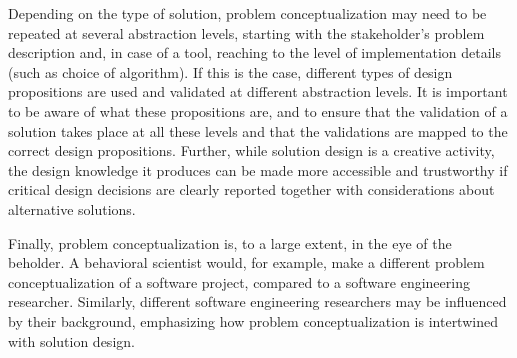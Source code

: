 \documentclass[graybox]{svmult}
\newcommand{\emelie}[1]{\textcolor{red}{{\it [Emelie says: #1]}}}
\newcommand{\peggy}[1]{\textcolor{blue}{{\it [Peggy says: #1]}}}
\newcommand{\per}[1]{\textcolor{cyan}{{\it [Per says: #1]}}}
\newcommand{\emelie}[1]{}
\newcommand{\peggy}[1]{}
\newcommand{\per}[1]{}
\begin{document}



Depending on the type of solution, problem conceptualization may need to be repeated at several abstraction levels, starting with the stakeholder's problem description and, in case of a tool, reaching to the level of implementation details (such as choice of algorithm). If this is the case, different types of design propositions are used and validated at different abstraction levels. It is important to be aware of what these propositions are, and to ensure that the validation of a solution takes place at all these levels and that the validations are mapped to the correct design propositions. Further, while solution design is a creative activity, the design knowledge it produces can be made more accessible and trustworthy if critical design decisions are clearly reported together with considerations about alternative solutions.

Finally, problem conceptualization is, to a large extent, in the eye of the beholder. A behavioral scientist would, for example, make a different problem conceptualization of a software project, compared to a software engineering researcher. Similarly, different software engineering researchers may be influenced by their background, emphasizing how problem conceptualization is intertwined with solution design.%
\end{document}
